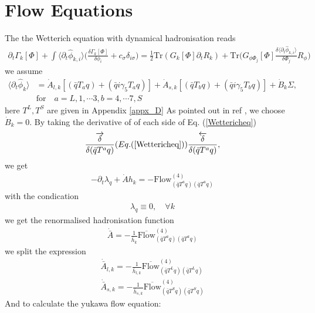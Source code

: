 \documentclass[12pt]{article}
\begin{document}
\section{Flow Equations}

The the Wetterich equation with dynamical hadronisation reads
\begin{align}
\partial_t \Gamma_k[\Phi]+\int \langle  \partial_t  \hat \phi_{k,i}\rangle \bigg ( \frac{\delta \Gamma_k [\Phi]}{\delta \phi_i}+c_\sigma \delta_{i \sigma}\bigg )
=\frac{1}{2} \text{Tr}(G_k[\Phi] \partial_t R_k)+\text{Tr}\bigg( G_{\phi \Phi_j} [\Phi] \frac{\delta \langle  \partial_t  \hat \phi_{k,i}\rangle}{\delta \Phi_j } R_{\phi} \bigg) \label{Wettericheq}
\end{align}
we assume 
\begin{align}
\langle  \partial_t  \hat \phi_{k}\rangle&= \dot{A}_{l,k}[(\bar q T_a  q)+(\bar q i \gamma _5 T_a q)]+\dot{A}_{s,k}[(\bar q T_b  q)+(\bar q i \gamma _5 T_b q)] +\dot{B}_k \Sigma,\\
&\text{for} \quad a=L,1,\cdots 3,b=4,\cdots7, S \nonumber
\end{align}
here $T^L,T^S$ are given in Appendix \ref{appx_D}
As pointed out in ref \cite{} , we choose $\dot{B}_k =0$.
By taking the derivative of of each side of Eq. (\ref{Wettericheq})
\begin{align}
\frac{\overrightarrow{\delta}}{\delta(\bar q T^a q)}(Eq. (\ref{Wettericheq}))\frac{\overleftarrow{\delta}}{\delta (\bar q T^a q)},
\end{align}
we get
\begin{align}
- \partial_t \lambda_q + \dot{A} h_{k}=-\text{Flow} _{(\bar q T^a q) (\bar q T^a q)}^{(4)}
\end{align}
with the condication
\begin{align}\label{lambda_eq}
\lambda_q  \equiv 0 , \quad \forall k
\end{align}
we get the renormalised hadronisation function
\begin{align}
\dot{\bar A}=-\frac{1}{\bar h_k}\overline{  \text{Flow} }_{(\bar q T^a q) (\bar q T^a q)}^{(4)}
\end{align}
we split the expression
\begin{align}
\dot{\bar A}_{l,k}=-\frac{1}{\bar h_{l,k}}\overline{  \text{Flow} }_{(\bar q T^L q) (\bar q T^L q)}^{(4)} \\
\dot{\bar A}_{s,k}=-\frac{1}{\bar h_{s,k}}\overline{  \text{Flow} }_{(\bar q T^S q) (\bar q T^S  q)}^{(4)}
\end{align}
And to calculate the yukawa flow equation:
\end{document}
